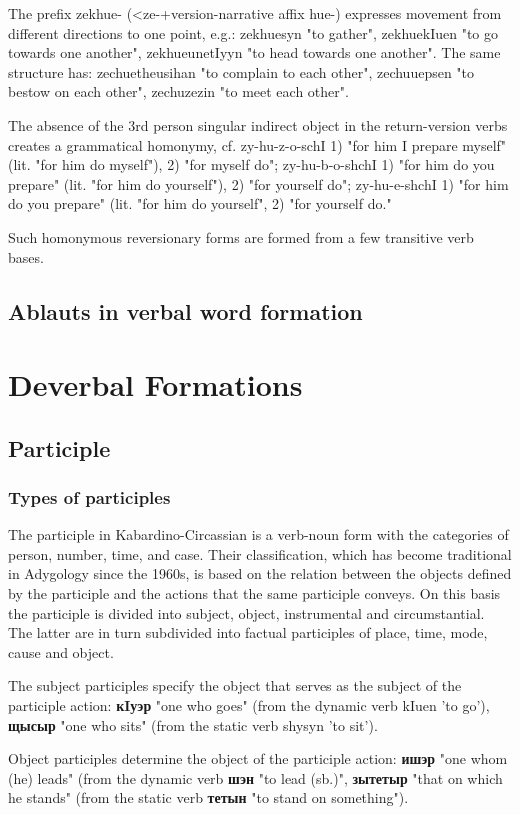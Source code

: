 \documentclass[a4paper,12pt]{book}
\newcommand{\1}[1]{\textbf{\emph{#1}}} %
\newcommand{\2}[1]{\textbf{[#1]}} %
\newcommand{\3}[1]{\fontsize{11pt}{0cm}\textbf{\emph{#1}}} %
\newcommand{\4}[1]{\fontsize{10pt}{0cm}\emph{#1}}	%
\newcommand{\5}[1]{\textbf{/#1/}} %
\newcommand{\6}[1]{\textbf{[#1]}} %
\newcommand{\7}[1]{\fontsize{12pt}{0cm}\emph{#1}} %
\newcommand{\8}[1]{\fontsize{12pt}{0cm}`#1'} %
\newcommand{\9}[1]{\fontsize{12pt}{0cm}(lit. `#1')} %
\begin{document}
The prefix zekhue- (<ze-+version-narrative affix hue-) expresses movement from different directions to one point, e.g.: zekhuesyn "to gather", zekhuekIuen "to go towards one another", zekhueunetIyyn "to head towards one another". The same structure has: zechuetheusihan "to complain to each other", zechuuepsen "to bestow on each other", zechuzezin "to meet each other".

The absence of the 3rd person singular indirect object in the return-version verbs creates a grammatical homonymy, cf. zy-hu-z-o-schI 1) "for him I prepare myself" (lit. "for him do myself"), 2) "for myself do"; zy-hu-b-o-shchI 1) "for him do you prepare" (lit. "for him do yourself"), 2) "for yourself do"; zy-hu-e-shchI 1) "for him do you prepare" (lit. "for him do yourself", 2) "for yourself do."

Such homonymous reversionary forms are formed from a few transitive verb bases.
\subsection{Ablauts in verbal word formation}

\section{Deverbal Formations}
\subsection{Participle}
\subsubsection{Types of participles}
The participle in Kabardino-Circassian is a verb-noun form with the categories of person, number, time, and case. Their classification, which has become traditional in Adygology since the 1960s, is based on the relation between the objects defined by the participle and the actions that the same participle conveys. On this basis the participle is divided into subject, object, instrumental and circumstantial. The latter are in turn subdivided into factual participles of place, time, mode, cause and object.

The subject participles specify the object that serves as the subject of the participle action: \textbf{кIуэр} "one who goes" (from the dynamic verb kIuen 'to go'), \textbf{щысыр} "one who sits" (from the static verb shysyn 'to sit').

Object participles determine the object of the participle action: \textbf{ишэр} "one whom (he) leads" (from the dynamic verb \textbf{шэн} "to lead (sb.)", \textbf{зытетыр} "that on which he stands" (from the static verb \textbf{тетын} "to stand on something").
\end{document}
